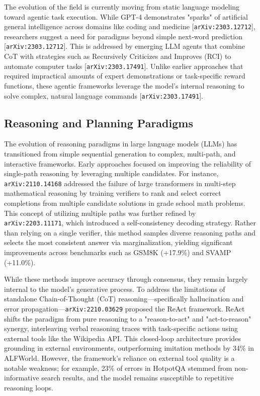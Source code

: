 \documentclass[11pt]{article}
\begin{document}
The evolution of the field is currently moving from static language modeling toward agentic task execution. While GPT-4 demonstrates "sparks" of artificial general intelligence across domains like coding and medicine [\texttt{arXiv:2303.12712}], researchers suggest a need for paradigms beyond simple next-word prediction [\texttt{arXiv:2303.12712}]. This is addressed by emerging LLM agents that combine CoT with strategies such as Recursively Criticizes and Improves (RCI) to automate computer tasks [\texttt{arXiv:2303.17491}]. Unlike earlier approaches that required impractical amounts of expert demonstrations or task-specific reward functions, these agentic frameworks leverage the model's internal reasoning to solve complex, natural language commands [\texttt{arXiv:2303.17491}].

\subsection{Reasoning and Planning Paradigms}

The evolution of reasoning paradigms in large language models (LLMs) has transitioned from simple sequential generation to complex, multi-path, and interactive frameworks. Early approaches focused on improving the reliability of single-path reasoning by leveraging multiple candidates. For instance, \texttt{arXiv:2110.14168} addressed the failure of large transformers in multi-step mathematical reasoning by training verifiers to rank and select correct completions from multiple candidate solutions in grade school math problems. This concept of utilizing multiple paths was further refined by \texttt{arXiv:2203.11171}, which introduced a self-consistency decoding strategy. Rather than relying on a single verifier, this method samples diverse reasoning paths and selects the most consistent answer via marginalization, yielding significant improvements across benchmarks such as GSM8K (+17.9\%) and SVAMP (+11.0\%).

While these methods improve accuracy through consensus, they remain largely internal to the model's generative process. To address the limitations of standalone Chain-of-Thought (CoT) reasoning—specifically hallucination and error propagation—\texttt{arXiv:2210.03629} proposed the ReAct framework. ReAct shifts the paradigm from pure reasoning to a "reason-to-act" and "act-to-reason" synergy, interleaving verbal reasoning traces with task-specific actions using external tools like the Wikipedia API. This closed-loop architecture provides grounding in external environments, outperforming imitation methods by 34\% in ALFWorld. However, the framework's reliance on external tool quality is a notable weakness; for example, 23\% of errors in HotpotQA stemmed from non-informative search results, and the model remains susceptible to repetitive reasoning loops.
\end{document}
